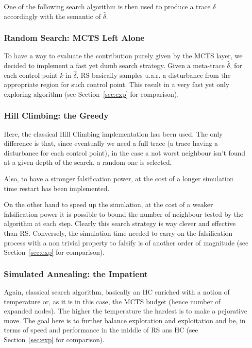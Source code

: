 \documentclass[11pt]{article}
\begin{document}
One of the following search algorithm is then used to produce a trace $\delta$ accordingly with the semantic of $\hat{\delta}$.

\subsubsection{Random Search: MCTS Left Alone}
To have a way to evaluate the contribution purely given by the MCTS layer, we decided to implement a fast yet dumb search strategy.
Given a meta-trace $\hat{\delta}$, for each control point $k$ in $\hat{\delta}$, RS basically samples u.a.r. a disturbance from the appropriate region for such control point.
This result in a very fast yet only exploring algorithm (see Section~\ref{sec:exp} for comparison). 

\subsubsection{Hill Climbing: the Greedy}
Here, the classical Hill Climbing implementation has been used. The only difference is that, since eventually we need a full trace (a trace having a disturbance for each control point), in the case a not worst neighbour isn't found at a given depth of the search, a random one is selected. 

Also, to have a stronger falsification power, at the cost of a longer simulation time restart has been implemented. 

On the other hand to speed up the simulation, at the cost of a weaker falsification power it is possible to bound the number of
neighbour tested by the algorithm at each step. 
Clearly this search strategy is way clever and effective than RS. Conversely, the simulation time needed to carry on the falsification process with a non trivial property to falsify is of another order of magnitude (see Section~\ref{sec:exp} for comparison).

\subsubsection{Simulated Annealing: the Impatient}
Again, classical search algorithm, basically an HC enriched with a notion of temperature or, as it is in this case, the MCTS budget (hence number of expanded nodes). The higher the temperature the hardest is to make a pejorative move. 
The goal here is to further balance exploration and exploitation and be, in terms of speed and performance in the middle of RS ans HC (see Section~\ref{sec:exp} for comparison).
\end{document}
